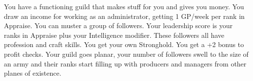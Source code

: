 {You have a functioning guild that makes stuff for you and gives you money.}
{You draw an income for working as an administrator, getting 1 GP/week per rank in Appraise.}
{You can muster a group of followers. Your leadership score is your ranks in Appraise plus your Intelligence modifier. These followers all have profession and craft skills.}
{You get your own Stronghold.}
{You get a +2 bonus to profit checks.}
{Your guild goes planar, your number of followers swell to the size of an army and their ranks start filling up with producers and managers from other planes of existence.}

